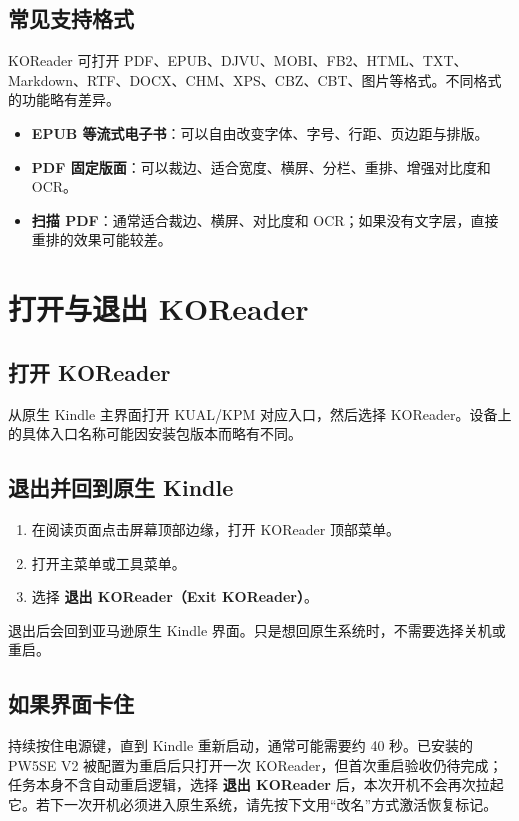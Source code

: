 \documentclass[10pt,a4paper]{article}
\begin{document}
\subsection{常见支持格式}

KOReader 可打开 PDF、EPUB、DJVU、MOBI、FB2、HTML、TXT、Markdown、RTF、DOCX、CHM、XPS、CBZ、CBT、图片等格式。不同格式的功能略有差异。

\begin{itemize}
  \item \textbf{EPUB 等流式电子书}：可以自由改变字体、字号、行距、页边距与排版。
  \item \textbf{PDF 固定版面}：可以裁边、适合宽度、横屏、分栏、重排、增强对比度和 OCR。
  \item \textbf{扫描 PDF}：通常适合裁边、横屏、对比度和 OCR；如果没有文字层，直接重排的效果可能较差。
\end{itemize}

\section{打开与退出 KOReader}

\subsection{打开 KOReader}

从原生 Kindle 主界面打开 KUAL/KPM 对应入口，然后选择 KOReader。设备上的具体入口名称可能因安装包版本而略有不同。

\subsection{退出并回到原生 Kindle}

\begin{enumerate}
  \item 在阅读页面点击屏幕顶部边缘，打开 KOReader 顶部菜单。
  \item 打开主菜单或工具菜单。
  \item 选择 \textbf{退出 KOReader（Exit KOReader）}。
\end{enumerate}

退出后会回到亚马逊原生 Kindle 界面。只是想回原生系统时，不需要选择关机或重启。

\subsection{如果界面卡住}

持续按住电源键，直到 Kindle 重新启动，通常可能需要约 40 秒。已安装的 PW5SE V2 被配置为重启后只打开一次 KOReader，但首次重启验收仍待完成；任务本身不含自动重启逻辑，选择 \textbf{退出 KOReader} 后，本次开机不会再次拉起它。若下一次开机必须进入原生系统，请先按下文用“改名”方式激活恢复标记。
\end{document}
